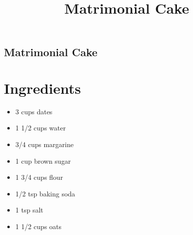 \documentclass{report}
\title{Matrimonial Cake}
\date{}
\providecommand{\tightlist}{%
  \setlength{\itemsep}{0pt}\setlength{\parskip}{0pt}}
\begin{document}
\begin{center}
\section*{Matrimonial Cake}
\vspace{2em}
\end{center}

\begin{minipage}[t]{0.45\textwidth}\vspace{0pt}


\hypertarget{ingredients}{%
\section*{Ingredients}\label{ingredients}}

\begin{itemize}
\tightlist
\item
  3 cups dates
\item
  1 1/2 cups water
\item
  3/4 cups margarine
\item
  1 cup brown sugar
\item
  1 3/4 cups flour
\item
  1/2 tsp baking soda
\item
  1 tsp salt
\item
  1 1/2 cups oats
\end{itemize}



\end{minipage}%
\hfill
\end{document}
